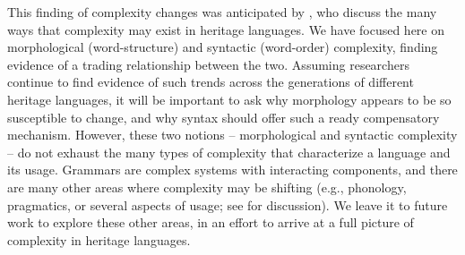 \documentclass[output=paper]{langscibook}
\begin{document}
This finding of complexity changes was anticipated by \citet{lalekoscontras2021}, who discuss the many ways that complexity may exist in heritage languages. We have focused here on morphological (word-structure) and syntactic (word-order) complexity,  finding evidence of a trading relationship between the two. Assuming researchers continue to find evidence of such trends across the generations of different heritage languages, it will be important to ask why morphology appears to be so susceptible to change, and why syntax should offer such a ready compensatory mechanism. However, these two notions -- morphological and syntactic complexity -- do not exhaust the many types of complexity that characterize a language and its usage. Grammars are complex systems with interacting components, and there are many other areas where complexity may be shifting (e.g., phonology, pragmatics, or several aspects of usage; see \citealp{lalekoscontras2021} for discussion). We leave it to future work to explore these other areas, in an effort to arrive at a full picture of complexity in heritage languages. 

\printbibliography[heading=subbibliography,notkeyword=this]
\end{document}
